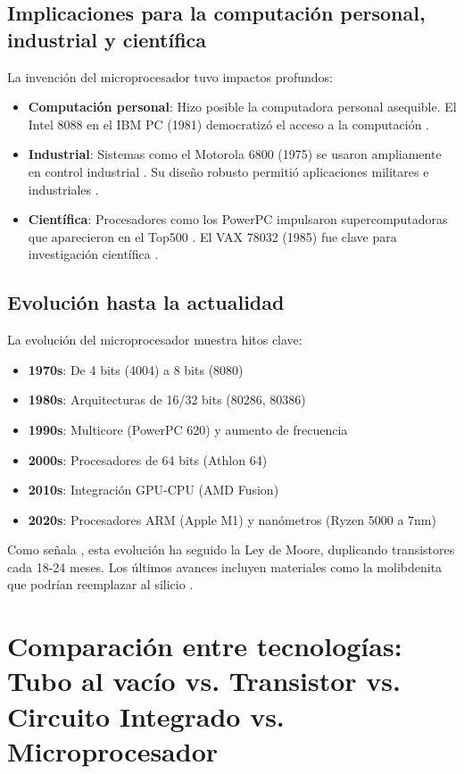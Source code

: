 \documentclass[]{article}
\begin{document}
\subsection{Implicaciones para la computación personal, industrial y científica}
La invención del microprocesador tuvo impactos profundos:
\begin{itemize}
    \item \textbf{Computación personal}: Hizo posible la computadora personal asequible. El Intel 8088 en el IBM PC (1981) democratizó el acceso a la computación \cite{rodriguez2007}.
    \item \textbf{Industrial}: Sistemas como el Motorola 6800 (1975) se usaron ampliamente en control industrial \cite{cpushack2014}. Su diseño robusto permitió aplicaciones militares e industriales \cite{cpushack2014}.
    \item \textbf{Científica}: Procesadores como los PowerPC impulsaron supercomputadoras que aparecieron en el Top500 \cite{top5002002}. El VAX 78032 (1985) fue clave para investigación científica \cite{rodriguez2007}.
\end{itemize}

\subsection{Evolución hasta la actualidad}
La evolución del microprocesador muestra hitos clave:
\begin{itemize}
    \item \textbf{1970s}: De 4 bits (4004) a 8 bits (8080)
    \item \textbf{1980s}: Arquitecturas de 16/32 bits (80286, 80386)
    \item \textbf{1990s}: Multicore (PowerPC 620) y aumento de frecuencia \cite{powerpc620}
    \item \textbf{2000s}: Procesadores de 64 bits (Athlon 64)
    \item \textbf{2010s}: Integración GPU-CPU (AMD Fusion)
    \item \textbf{2020s}: Procesadores ARM (Apple M1) y nanómetros (Ryzen 5000 a 7nm)
\end{itemize}
Como señala \cite{guevara2015}, esta evolución ha seguido la Ley de Moore, duplicando transistores cada 18-24 meses. Los últimos avances incluyen materiales como la molibdenita que podrían reemplazar al silicio \cite{muycomputer2011}.


\section{Comparación entre tecnologías: Tubo al vacío vs. Transistor vs. Circuito Integrado vs. Microprocesador}
\label{sec:comparacion}
\end{document}
